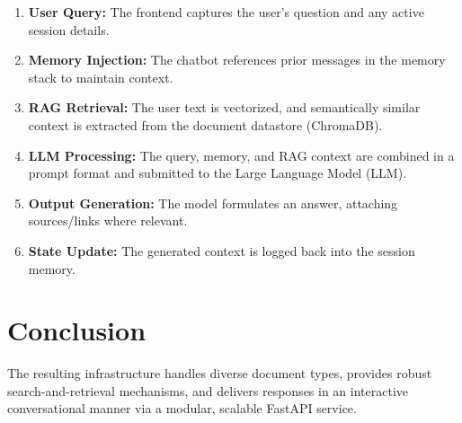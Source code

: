 \documentclass{article}
\begin{document}
\begin{enumerate}
    \item \textbf{User Query:} The frontend captures the user's question and any active session details.
    \item \textbf{Memory Injection:} The chatbot references prior messages in the memory stack to maintain context.
    \item \textbf{RAG Retrieval:} The user text is vectorized, and semantically similar context is extracted from the document datastore (ChromaDB).
    \item \textbf{LLM Processing:} The query, memory, and RAG context are combined in a prompt format and submitted to the Large Language Model (LLM).
    \item \textbf{Output Generation:} The model formulates an answer, attaching sources/links where relevant.
    \item \textbf{State Update:} The generated context is logged back into the session memory.
\end{enumerate}

\section{Conclusion}
The resulting infrastructure handles diverse document types, provides robust search-and-retrieval mechanisms, and delivers responses in an interactive conversational manner via a modular, scalable FastAPI service.
\end{document}
